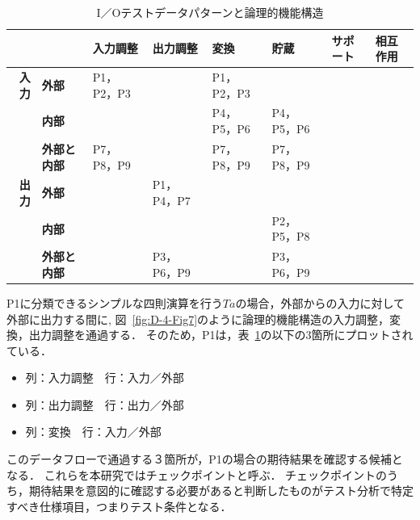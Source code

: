 \begin{table}[htbp]
  \centering
  \caption{I／Oテストデータパターンと論理的機能構造}
    \begin{tabular}{|r|p{4em}|l|l|l|p{4em}|l|l|}
    \hline
          & \multicolumn{1}{l|}{} & \multicolumn{1}{p{4em}|}{\textbf{入力調整}} & \multicolumn{1}{p{4em}|}{\textbf{出力調整}} & \multicolumn{1}{p{4em}|}{\textbf{変換}} & \textbf{貯蔵} & \multicolumn{1}{p{2em}|}{\textbf{サポート}} & \multicolumn{1}{p{1.915em}|}{\textbf{相互作用}} \bigstrut\\
    \hline
    \multicolumn{1}{|p{1.5em}|}{\textbf{入力}} & \textbf{外部} & \multicolumn{1}{p{4em}|}{P1，P2，P3} &       & \multicolumn{1}{p{4em}|}{P1，P2，P3} & \multicolumn{1}{l|}{} &       &  \bigstrut\\
\cline{2-8}          & \textbf{内部} &       &       & \multicolumn{1}{p{4em}|}{P4，P5，P6} & P4，P5，P6 &       &  \bigstrut\\
\cline{2-8}          & \textbf{外部と内部} & \multicolumn{1}{p{4em}|}{P7，P8，P9} &       & \multicolumn{1}{p{4em}|}{P7，P8，P9} & P7，P8，P9 &       &  \bigstrut\\
    \hline
    \multicolumn{1}{|p{1.5em}|}{\textbf{出力}} & \textbf{外部} &       & \multicolumn{1}{p{4em}|}{P1，P4，P7} &       & \multicolumn{1}{l|}{} &       &  \bigstrut\\
\cline{2-8}          & \textbf{内部} &       &       &       & P2，P5，P8 &       &  \bigstrut\\
\cline{2-8}          & \textbf{外部と内部} &       & P3，P6，P9 &       & P3，P6，P9 &       &  \bigstrut\\
    \hline
    \end{tabular}%
  \label{tbl:D-4-tbl1}%
\end{table}%


P1に分類できるシンプルな四則演算を行う$Ta$の場合，外部からの入力に対して外部に出力する間に,
図~\ref{fig:D-4-Fig7}のように論理的機能構造の入力調整，変換，出力調整を通過する．
そのため，P1は，表~\ref{tbl:D-4-tbl1}の以下の3箇所にプロットされている．
\begin{itemize}
  \item 列：入力調整　行：入力／外部
  \item 列：出力調整　行：出力／外部
  \item 列：変換　行：入力／外部
\end{itemize}

このデータフローで通過する３箇所が，P1の場合の期待結果を確認する候補となる．
これらを本研究ではチェックポイントと呼ぶ．
チェックポイントのうち，期待結果を意図的に確認する必要があると判断したものがテスト分析で特定すべき仕様項目，つまりテスト条件となる．


